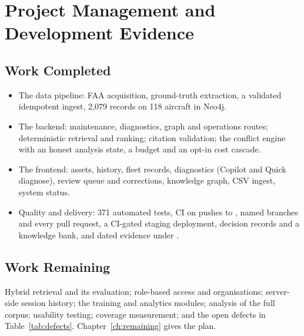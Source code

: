 \chapter{Project Management and Development Evidence}\label{ch:evidence}

\section{Work Completed}
\begin{itemize}
\item The data pipeline: FAA acquisition, ground-truth extraction, a validated idempotent ingest, 2,079 records on 118 aircraft in Neo4j.
\item The backend: maintenance, diagnostics, graph and operations routes; deterministic retrieval and ranking; citation validation; the conflict engine with an honest analysis state, a budget and an opt-in cost cascade.
\item The frontend: assets, history, fleet records, diagnostics (Copilot and Quick diagnose), review queue and corrections, knowledge graph, CSV ingest, system status.
\item Quality and delivery: 371 automated tests, CI on pushes to , named branches and every pull request, a CI-gated staging deployment, decision records and a knowledge bank, and dated evidence under .
\end{itemize}

\section{Work Remaining}
Hybrid retrieval and its evaluation; role-based access and organisations; server-side session history; the training and analytics modules; analysis of the full corpus; usability testing; coverage measurement; and the open defects in Table~\ref{tab:defects}. Chapter~\ref{ch:remaining} gives the plan.

